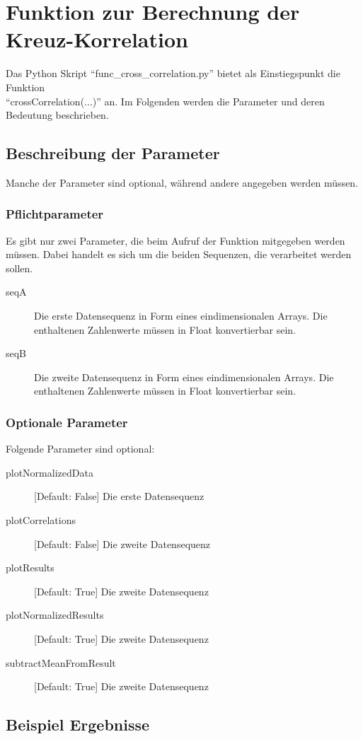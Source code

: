 \documentclass[a4paper, 12pt, oneside]{scrbook}
\begin{document}
\chapter{Funktion zur Berechnung der Kreuz-Korrelation}
Das Python Skript \enquote{func\_cross\_correlation.py} bietet als Einstiegspunkt die Funktion\\ \mbox{\enquote{crossCorrelation(...)}} an. Im Folgenden werden die Parameter und deren Bedeutung beschrieben.

\section{Beschreibung der Parameter}
Manche der Parameter sind optional, während andere angegeben werden müssen.
\subsection{Pflichtparameter}
Es gibt nur zwei Parameter, die beim Aufruf der Funktion mitgegeben werden müssen. Dabei handelt es sich um die beiden Sequenzen, die verarbeitet werden sollen.
\begin{description}
\item[seqA] Die erste Datensequenz in Form eines eindimensionalen Arrays. Die enthaltenen Zahlenwerte müssen in Float konvertierbar sein.
\item[seqB] Die zweite Datensequenz in Form eines eindimensionalen Arrays. Die enthaltenen Zahlenwerte müssen in Float konvertierbar sein.
\end{description}

\subsection{Optionale Parameter}
Folgende Parameter sind optional:
\begin{description}
\item[plotNormalizedData][Default: False] Die erste Datensequenz
\item[plotCorrelations] [Default: False] Die zweite Datensequenz
\item[plotResults] [Default: True] Die zweite Datensequenz
\item[plotNormalizedResults] [Default: True] Die zweite Datensequenz
\item[subtractMeanFromResult] [Default: True] Die zweite Datensequenz
\end{description}

\section{Beispiel Ergebnisse}
\end{document}
